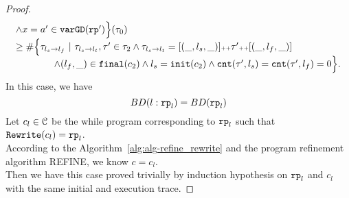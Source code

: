 \begin{proof}
\[\begin{array}{l}
{    \land x = a' \in \ensuremath{\mathtt{varGD}}(\ensuremath{\mathtt{rp}}')
    \Big\}
    }(\mathtt{\tau}_0) \\
    \geq
    \# \Big\{\mathtt{\tau}_{l_s \to l_f} ~\vert~ \mathtt{\tau}_{l_s \to l_t}, \mathtt{\tau}' \in \mathtt{\tau}_2 \land \mathtt{\tau}_{l_s \to l_t} = [(\_, l_s, \_)] {\scriptscriptstyle ++} \mathtt{\tau}' {\scriptscriptstyle ++} [(\_, l_f, \_)]
    \\ \qquad \qquad
    \land (l_{f}, \_) \in \mathtt{final}(c_2)
    \land l_s = \mathtt{init}(c_2)
    \land \mathtt{cnt}(\mathtt{\tau}', l_s) = \mathtt{cnt}(\mathtt{\tau}', l_f) = 0 
    \Big\}.
    \end{array}
\]
In this case, we have
\[
  BD(l: \mathtt{rp}_l) = BD(\mathtt{rp}_l)
\]
Let $c_l \in \mathcal{C}$ be the while program corresponding to $\mathtt{rp}_l$ such that $\mathtt{Rewrite}(c_l) = \mathtt{rp}_l$.
\\
According to the Algorithm~\ref{alg:alg-refine_rewrite} and the program refinement algorithm REFINE, we know
$c = c_l$.
\\
Then we have this case proved trivially by induction hypothesis on $\mathtt{rp}_l$ and $c_l$ with the same initial and execution trace.
\end{proof}